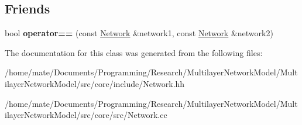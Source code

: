 \subsection*{Friends}
\begin{DoxyCompactItemize}
\item 
bool {\bfseries operator==} (const \hyperlink{classNetwork}{Network} \&network1, const \hyperlink{classNetwork}{Network} \&network2)\hypertarget{classNetwork_a7a1b02eac9fc1db7f981fe618019d99a}{}\label{classNetwork_a7a1b02eac9fc1db7f981fe618019d99a}

\end{DoxyCompactItemize}


The documentation for this class was generated from the following files\+:\begin{DoxyCompactItemize}
\item 
/home/mate/\+Documents/\+Programming/\+Research/\+Multilayer\+Network\+Model/\+Multilayer\+Network\+Model/src/core/include/Network.\+hh\item 
/home/mate/\+Documents/\+Programming/\+Research/\+Multilayer\+Network\+Model/\+Multilayer\+Network\+Model/src/core/src/Network.\+cc\end{DoxyCompactItemize}
